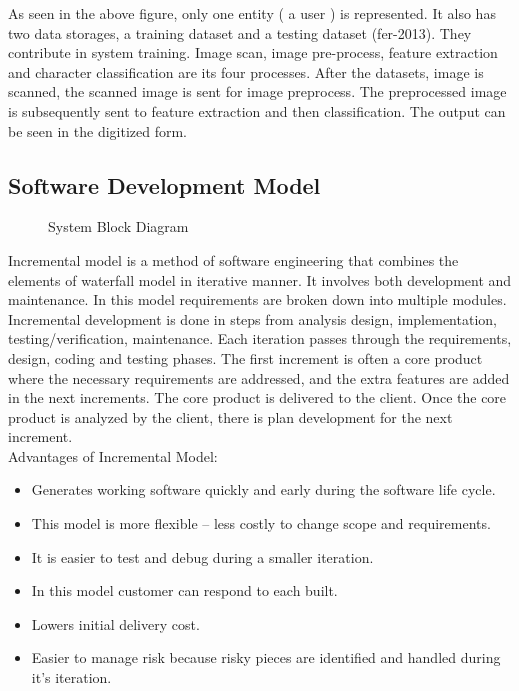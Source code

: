 As seen in the above figure, only one entity ( a user ) is represented. It also has two data storages, a training dataset and a testing dataset (fer-2013). They contribute in system training. Image scan, image pre-process, feature extraction and character classification are its four processes. After the datasets, image is scanned, the scanned image is sent for image preprocess. The preprocessed image is subsequently sent to feature extraction and then classification. The output can be seen in the digitized form. 
 \subsection{Software Development Model}
 \begin{figure}[tbh] %
\begin{center}
	\caption{System Block Diagram} %
	\label{figLaneDetectionusingFeatureSelection} %
\end{center}
\end{figure}
 Incremental model is a method of software engineering that combines the elements of waterfall model in iterative manner. It involves both development and maintenance. In this model requirements are broken down into multiple modules. Incremental development is done in steps from analysis design, implementation, testing/verification, maintenance. Each iteration passes through the requirements, design, coding and testing phases. The first increment is often a core product where the necessary requirements are addressed, and the extra features are added in the next increments. The core product is delivered to the client. Once the core product is analyzed by the client, there is plan development for the next increment.\\
 Advantages of Incremental Model:
 \begin{itemize}
\item Generates working software quickly and early during the software life cycle.
\item This model is more flexible – less costly to change scope and requirements.
\item It is easier to test and debug during a smaller iteration.
\item In this model customer can respond to each built.
\item Lowers initial delivery cost.
\item Easier to manage risk because risky pieces are identified and handled during it's iteration.

 \end{itemize}
 


